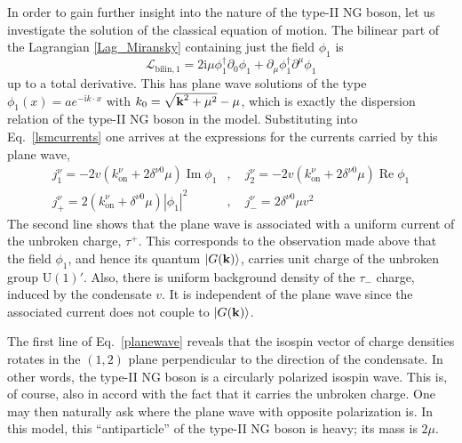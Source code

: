 \documentclass[final,2p,times,12pt,sort&compress]{elsarticle}
\newcommand\gr[1]{\mathrm{#1}}              %
\newcommand\Lag{\mathscr{L}}                %
\newcommand\vek[1]{{\boldsymbol{\bf #1}}}   %
\newcommand\ket[1]{\vert#1\rangle}          %
\newcommand\he[1]{#1^{\dagger}}             %
\newcommand\imag{\mathrm i}                 %
\newcommand\de{\partial}
\newcommand\abs[1]{\left|#1\right|}         %
\DeclareMathOperator{\re}{Re}               %
\DeclareMathOperator{\im}{Im}               %
\begin{document}
In order to gain further insight into the nature of the type-II NG boson, let
us investigate the solution of the classical equation of motion. The bilinear
part of the Lagrangian \eqref{Lag_Miransky} containing just the field $\phi_1$
is
\begin{equation}
\Lag_{\text{bilin},1}
=2\imag\mu\he\phi_1\de_0\phi_1+\de_\mu\he\phi_1\de^\mu\phi_1
\end{equation}
up to a total derivative. This has plane wave solutions of the type
$\phi_1(x)=ae^{-\imag k\cdot x}$ with $k_0=\sqrt{\vek k^2+\mu^2}-\mu$, which is
exactly the dispersion relation of the type-II NG boson in the model.
Substituting into Eq.~\eqref{lsmcurrents} one arrives at the expressions for
the currents carried by this plane wave,
\begin{equation}
\begin{split}
j_1^\nu=-2v(k^\nu_{\text{on}}+2\delta^{\nu0}\mu)\im\phi_1&,\quad
j_2^\nu=-2v(k^\nu_{\text{on}}+2\delta^{\nu0}\mu)\re\phi_1\\
j_+^\nu=2(k^\nu_{\text{on}}+\delta^{\nu0}\mu)\abs{\phi_1}^2&,\quad
j_-^\nu=2\delta^{\nu0}\mu v^2
\end{split}
\label{planewave}
\end{equation}
The second line shows that the plane wave is associated with a uniform current
of the unbroken charge, $\tau^+$. This corresponds to the observation made
above that the field $\phi_1$, and hence its quantum $\ket{G(\vek k)}$,
carries unit charge of the unbroken group $\gr{U(1)}'$. Also, there is uniform
background density of the $\tau_-$ charge, induced by the condensate $v$. It is
independent of the plane wave since the associated current does not couple to
$\ket{G(\vek k)}$.

The first line of Eq.~\eqref{planewave} reveals that the isospin vector of
charge densities rotates in the $(1,2)$ plane perpendicular to the direction of
the condensate. In other words, the type-II NG boson is a circularly polarized
isospin wave. This is, of course, also in accord with the fact that it carries
the unbroken charge. One may then naturally ask where the plane wave with
opposite polarization is. In this model, this ``antiparticle'' of the type-II
NG boson is heavy; its mass is $2\mu$.
\end{document}
